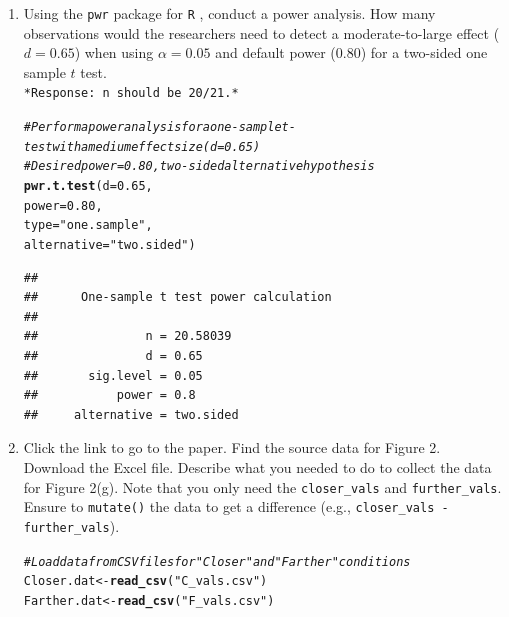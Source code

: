 \documentclass{article}\usepackage[]{graphicx}\usepackage[]{xcolor}
\makeatletter
\newcommand{\hlnum}[1]{\textcolor[rgb]{0.686,0.059,0.569}{#1}}%
\newcommand{\hlsng}[1]{\textcolor[rgb]{0.192,0.494,0.8}{#1}}%
\newcommand{\hlcom}[1]{\textcolor[rgb]{0.678,0.584,0.686}{\textit{#1}}}%
\newcommand{\hldef}[1]{\textcolor[rgb]{0.345,0.345,0.345}{#1}}%
\newcommand{\hlkwb}[1]{\textcolor[rgb]{0.69,0.353,0.396}{#1}}%
\newcommand{\hlkwc}[1]{\textcolor[rgb]{0.333,0.667,0.333}{#1}}%
\newcommand{\hlkwd}[1]{\textcolor[rgb]{0.737,0.353,0.396}{\textbf{#1}}}%
\newenvironment{kframe}{%
 \def\at@end@of@kframe{}%
 \ifinner\ifhmode%
  \def\at@end@of@kframe{\end{minipage}}%
  \begin{minipage}{\columnwidth}%
 \fi\fi%
 \def\FrameCommand##1{\hskip\@totalleftmargin \hskip-\fboxsep
 \colorbox{shadecolor}{##1}\hskip-\fboxsep
     \hskip-\linewidth \hskip-\@totalleftmargin \hskip\columnwidth}%
 \MakeFramed {\advance\hsize-\width
   \@totalleftmargin\z@ \linewidth\hsize
   \@setminipage}}%
 {\par\unskip\endMakeFramed%
 \at@end@of@kframe}
\newenvironment{knitrout}{}{} %
\makeatother
\begin{document}
\begin{enumerate}
\item Using the \texttt{pwr} package for \texttt{R} \citep{pwr},
conduct a power analysis. How many observations would the researchers 
need to detect a moderate-to-large effect ($d=0.65$) when using 
$\alpha=0.05$ and default power (0.80) for a two-sided one sample 
$t$ test. \\
\texttt{*Response: n should be 20/21.*}
\begin{knitrout}\scriptsize
{}\color{fgcolor}\begin{kframe}
\begin{alltt}
\hlcom{# Perform a power analysis for a one-sample t-test with a medium effect size (d = 0.65)}
\hlcom{# Desired power = 0.80, two-sided alternative hypothesis}
\hlkwd{pwr.t.test}\hldef{(}\hlkwc{d} \hldef{=} \hlnum{0.65}\hldef{,}
           \hlkwc{power} \hldef{=} \hlnum{0.80}\hldef{,}
           \hlkwc{type} \hldef{=} \hlsng{"one.sample"}\hldef{,}
           \hlkwc{alternative} \hldef{=} \hlsng{"two.sided"}\hldef{)}
\end{alltt}
\begin{verbatim}
## 
##      One-sample t test power calculation 
## 
##               n = 20.58039
##               d = 0.65
##       sig.level = 0.05
##           power = 0.8
##     alternative = two.sided
\end{verbatim}
\end{kframe}
\end{knitrout}

\item Click the link to go to the paper. Find the source data for 
Figure 2. Download the Excel file. Describe what you needed to
do to collect the data for Figure 2(g). Note that you only need the 
\texttt{closer\_vals} and \texttt{further\_vals}. Ensure to 
\texttt{mutate()} the data to get a difference 
(e.g., \texttt{closer\_vals - further\_vals}).
\begin{knitrout}\scriptsize
{}\color{fgcolor}\begin{kframe}
\begin{alltt}
\hlcom{# Load data from CSV files for "Closer" and "Farther" conditions}
\hldef{Closer.dat} \hlkwb{<-} \hlkwd{read_csv}\hldef{(}\hlsng{"C_vals.csv"}\hldef{)}
\hldef{Farther.dat} \hlkwb{<-} \hlkwd{read_csv}\hldef{(}\hlsng{"F_vals.csv"}\hldef{)}


\end{alltt}
\end{kframe}
\end{knitrout}
\end{enumerate}
\end{document}
